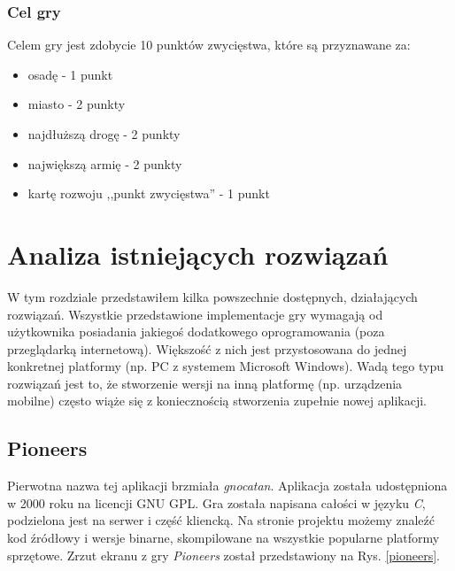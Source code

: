 \documentclass[a4paper,12pt]{article}
\providecommand{\imref}[1]{Rys. \ref{#1}} %
\begin{document}
\subsubsection{Cel gry}
Celem gry jest zdobycie 10 punktów zwycięstwa, które są przyznawane
za:

\begin{itemize}
\item osadę - 1 punkt
\item miasto - 2 punkty
\item najdłuższą drogę - 2 punkty
\item największą armię - 2 punkty
\item kartę rozwoju ,,punkt zwycięstwa'' - 1 punkt
\end{itemize}

\clearpage

\section{Analiza istniejących rozwiązań}
W tym rozdziale przedstawiłem kilka powszechnie dostępnych,
działających rozwiązań. Wszystkie przedstawione implementacje gry
wymagają od użytkownika posiadania jakiegoś dodatkowego oprogramowania
(poza przeglądarką internetową). Większość z nich jest przystosowana
do jednej konkretnej platformy (np. PC z systemem Microsoft
Windows). Wadą tego typu rozwiązań jest to, że stworzenie wersji na
inną platformę (np. urządzenia mobilne) często wiąże się z
koniecznością stworzenia zupełnie nowej aplikacji.

\subsection{Pioneers}
Pierwotna nazwa tej aplikacji brzmiała \emph{gnocatan}. Aplikacja
została udostępniona w 2000 roku na licencji GNU GPL. Gra została
napisana całości w języku \emph{C}, podzielona jest na serwer i część
kliencką. Na stronie projektu \cite{pioneers} możemy znaleźć kod
źródłowy i wersje binarne, skompilowane na wszystkie popularne
platformy sprzętowe. Zrzut ekranu z gry \emph{Pioneers} został
przedstawiony na \imref{pioneers}.
\end{document}
